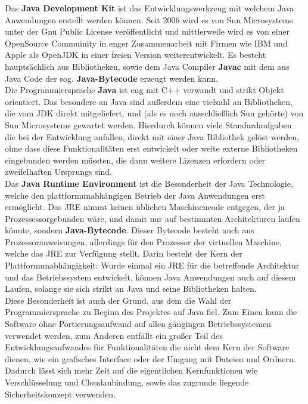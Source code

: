 \documentclass[12pt,a4paper,bibliography=totocnumbered,listof=totocnumbered]{scrartcl}
\begin{document}
Das \textbf{Java Development Kit} ist das Entwicklungswerkzeug mit welchem Java Anwendungen erstellt werden können. Seit 2006 wird es von Sun Microsystems unter der Gnu Public License veröffentlicht und mittlerweile wird es von einer OpenSource Commuinity in enger Zusammenarbeit mit Firmen wie IBM und Apple als OpenJDK in einer freien Version weiterentwickelt. Es besteht hauptsächlich aus Bibliotheken, sowie dem Java Compiler \textbf{Javac} mit dem aus Java Code der sog. \textbf{Java-Bytecode} erzeugt werden kann.\\
Die Programmiersprache \textbf{Java} ist eng mit C++ verwandt und strikt Objekt orientiert. Das besondere an Java sind außerdem eine vielzahl an Bibliotheken, die vom JDK direkt mitgeliefert, und (als es noch ausschließlich Sun gehörte) von Sun Microsystems gewartet werden. Hierdurch können viele Standardaufgaben die bei der Entwicklung anfallen, direkt mit einer Java Bibliothek gelöst werden, ohne dass diese Funktionalitäten erst entwickelt oder weite externe Bibliotheken eingebunden werden müssten, die dann weitere Lizenzen erfordern oder zweifelhaften Ursprungs sind.\\
Das \textbf{Java Runtime Environment} ist die Besonderheit der Java Technologie, welche den plattformunabhängigen Betrieb der Java Anwendungen erst ermöglicht. Das  JRE nimmt keinen üblichen Maschinencode entgegen, der ja Prozessessorgebunden wäre, und damit nur auf bestimmten Architekturen laufen könnte, sondern \textbf{Java-Bytecode}. Dieser Bytecode besteht auch aus Prozessoranweisungen, allerdings für den Prozessor der virtuellen Maschine, welche das JRE zur Verfügung stellt. Darin besteht der Kern der Plattformunabhängigkeit: Wurde einmal ein JRE für die betreffende Architektur und das Betriebssystem entwickelt, können Java Anwendungen auch auf diesem Laufen, solange sie sich strikt an Java und seine Bibliotheken halten.\\
Diese Besonderheit ist auch der Grund, aus dem die Wahl der Programmiersprache zu Beginn des Projektes auf Java fiel. Zum Einen kann die Software ohne Portierungsaufwand auf allen gängingen Betriebssystemen verwendet werden, zum Anderen entfällt ein großer Teil des Entwicklungsaufwandes für Funktionalitäten die nicht dem Kern der Software dienen, wie ein grafisches Interface oder der Umgang mit Dateien und Ordnern. Dadurch lässt sich mehr Zeit auf die eigentlichen Kernfunktionen wie Verschlüsselung und Cloudanbindung,  sowie das zugrunde liegende Sicherheitskonzept verwenden.
\\\cite{1}\cite{2}\cite{3}
\end{document}
